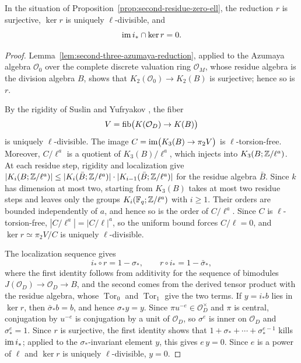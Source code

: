 \begin{lemma}\label{lem:second-residue-zero-ell-integral}
In the situation of Proposition~\ref{prop:second-residue-zero-ell}, the reduction $r$ is surjective, $\ker r$ is uniquely $\ell$-divisible, and
\[
 \operatorname{im} i_*\cap\ker r=0.
\]
\end{lemma}
\begin{proof}
Lemma~\ref{lem:second-three-azumaya-reduction}, applied to the Azumaya algebra $\mathcal O_0$ over the complete discrete valuation ring $\mathcal O_M$, whose residue algebra is the division algebra $B$, shows that $K_2(\mathcal O_0)\to K_2(B)$ is surjective; hence so is $r$.

By the rigidity of Suslin and Yufryakov \cite[\S3, Theorem 2 and Corollary 2]{SuslinYufryakov}, the fiber
\[
 V=\operatorname{fib}\bigl(K(\mathcal O_D)\to K(B)\bigr)
\]
is uniquely $\ell$-divisible.
The image $C=\operatorname{im}\bigl(K_3(B)\to\pi_2V\bigr)$ is $\ell$-torsion-free.
Moreover, $C/\ell^a$ is a quotient of $K_3(B)/\ell^a$, which injects into $K_3(B;\mathbb Z/\ell^a)$.
At each residue step, rigidity and localization give $|K_i(B;\mathbb Z/\ell^a)|\le|K_i(\bar B;\mathbb Z/\ell^a)|\cdot|K_{i-1}(\bar B;\mathbb Z/\ell^a)|$ for the residue algebra $\bar B$.
Since $k$ has dimension at most two, starting from $K_3(B)$ takes at most two residue steps and leaves only the groups $K_i(\mathbb F_q;\mathbb Z/\ell^a)$ with $i\ge1$.
Their orders are bounded independently of $a$, and hence so is the order of $C/\ell^a$.
Since $C$ is $\ell$-torsion-free, $|C/\ell^a|=|C/\ell|^a$, so the uniform bound forces $C/\ell=0$, and $\ker r\simeq\pi_2V/C$ is uniquely $\ell$-divisible.

The localization sequence gives
\[
 i_*\circ r=1-\sigma_*,\qquad r\circ i_*=1-\bar\sigma_*,
\]
where the first identity follows from additivity for the sequence of bimodules $J(\mathcal O_D)\to\mathcal O_D\to B$, and the second comes from the derived tensor product with the residue algebra, whose $\operatorname{Tor}_0$ and $\operatorname{Tor}_1$ give the two terms.
If $y=i_*b$ lies in $\ker r$, then $\bar\sigma_*b=b$, and hence $\sigma_*y=y$.
Since $\pi u^{-e}\in\mathcal O_D^\times$ and $\pi$ is central, conjugation by $u^{-e}$ is conjugation by a unit of $\mathcal O_D$, so $\sigma^e$ is inner on $\mathcal O_D$ and $\sigma_*^e=1$.
Since $r$ is surjective, the first identity shows that $1+\sigma_*+\cdots+\sigma_*^{e-1}$ kills $\operatorname{im} i_*$; applied to the $\sigma_*$-invariant element $y$, this gives $e\,y=0$.
Since $e$ is a power of $\ell$ and $\ker r$ is uniquely $\ell$-divisible, $y=0$.
\end{proof}

